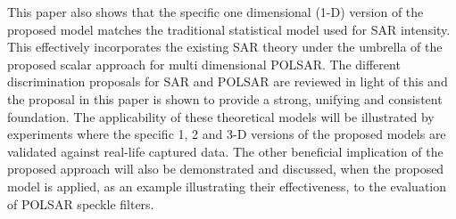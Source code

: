 \documentclass[journal]{IEEEtran}
\begin{document}
This paper also shows that %
   the specific one dimensional (1-D) version of the proposed  model 
   matches %
   the traditional statistical model used for SAR intensity.
This effectively incorporates the existing SAR theory under the umbrella of the proposed scalar approach for multi dimensional POLSAR.
The different discrimination proposals for SAR and POLSAR are reviewed in light of this and the  proposal in this paper is shown to provide a strong, unifying and consistent foundation. %
The applicability of these theoretical models will be illustrated by experiments where the specific 1, 2 and 3-D versions of the proposed models are validated against real-life captured data.    
The other beneficial implication of the proposed approach will also be demonstrated and discussed,
  when the proposed model is applied, as an example illustrating their effectiveness, to the evaluation of POLSAR speckle filters.

\end{document}
